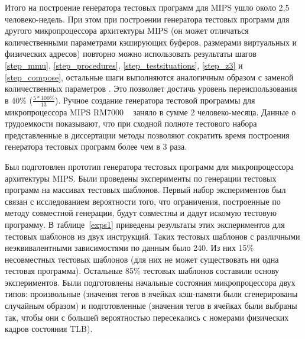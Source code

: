 Итого на построение генератора тестовых программ для MIPS ушло около
2,5 человеко-недель. При этом при построении генератора тестовых
программ для другого микропроцессора архитектуры MIPS (он может
отличаться количественными параметрами кэширующих буферов, размерами
виртуальных и физических адресов) повторно можно использовать
результаты шагов \ref{step_mmu}, \ref{step_procedures},
\ref{step_testsituations}, \ref{step_z3} и \ref{step_compose},
остальные шаги выполняются аналогичным образом с заменой
количественных параметров . Это позволяет достичь уровень
переиспользования в 40\% ($\frac{5 * 100\%}{13}$). Ручное создание
генератора тестовой программы для микропроцессора MIPS RM7000
~\cite{kamkin} заняло в сумме 2 человеко-месяца. Данные о
трудоемкости показывают, что при сходной полноте тестового набора
представленные в диссертации методы позволяют сократить время
построения генератора тестовых программ более чем в 3 раза.

Был подготовлен прототип генератора тестовых программ для
микропроцессора архитектуры MIPS. Были проведены эксперименты по
генерации тестовых программ на массивах тестовых шаблонов. Первый
набор экспериментов был связан с исследованием вероятности того, что
ограничения, построенные по методу совместной генерации, будут
совместны и дадут искомую тестовую программу. В таблице~\ref{exps1}
приведены результаты этих экспериментов для тестовых шаблонов из
двух инструкций. Таких тестовых шаблонов с различными
неэквивалентными зависимостями по данным было 240. Из них 15\%
несовместных тестовых шаблонов (для них не может существовать ни
одна тестовая программа). Остальные 85\% тестовых шаблонов составили
основу экспериментов. Были подготовлены начальные состояния
микропроцессора двух типов: произвольные (значения тегов в ячейках
кэш-памяти были сгенерированы случайным образом) и подготовленные
(значения тегов в ячейках были выбраны так, чтобы они с большей
вероятностью пересекались с номерами физических кадров состояния
TLB).

